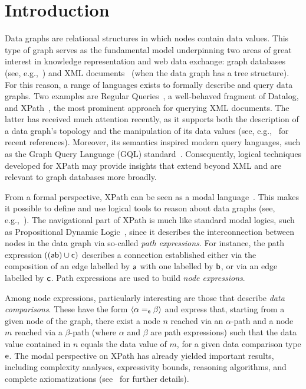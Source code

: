 \section{Introduction}
\label{sec:intro}

Data graphs are relational structures in which nodes contain data values. This type of graph serves as the fundamental model underpinning two areas of great interest in knowledge representation and web data exchange: graph databases (see, e.g.,~\cite{AnglesG08,LV12}) and XML documents~\cite{xpath:w3c} (when the data graph has a tree structure). For this reason, a range of languages exists to formally describe and query data graphs. Two examples are Regular Queries~\cite{ReutterRV17}, a well-behaved fragment of Datalog, and XPath~\cite{xpath:w3c,BojanczykMSS09}, the most prominent approach for querying XML documents. The latter has received much attention recently, as it supports both the description of a data graph's topology and the manipulation of its data values (see, e.g.,~\cite{ArecesCF25,ACDF25} for recent references). Moreover, its semantics inspired modern query languages, such as the Graph Query Language (GQL) standard~\cite{FrancisGGLMMMPR23,FrancisGGLMMMPR23b}. Consequently, logical techniques developed for XPath may provide insights that extend beyond XML and are relevant to graph databases more broadly.


From a formal perspective,  XPath can be seen as a modal language~\cite{blackburn2001modal,blackburn06}. This makes it possible to define and use logical tools to reason about data graphs (see, e.g.,~\cite{ICDT14Jair,AbriolaDFF17,Areces2017a,Figueira18,AbriolaBFF18,ArecesF21,ArecesCF25}). The navigational part of XPath is much like standard modal logics, such as Propositional Dynamic Logic~\cite{HKT00}, since it describes the interconnection between nodes in the data graph via so-called \emph{path expressions}. For instance, the path expression $((\mathsf{a}\mathsf{b}) \cup \mathsf{c})$ describes a connection established either via the composition of an edge labelled by $\mathsf{a}$ with one labelled by $\mathsf{b}$, or via an edge labelled by $\mathsf{c}$. Path expressions are used to build \emph{node expressions}.

Among node expressions, particularly interesting are those that describe \emph{data comparisons}. These have the form $\langle{\alpha =_{\mathsf{e}}\beta}\rangle$ and express that, starting from a given node of the graph, there exist a node $n$ reached via an $\alpha$-path and a node $m$ reached via a $\beta$-path (where $\alpha$ and $\beta$ are path expressions) such that the data value contained in $n$ equals the data value of $m$, for a given data comparison type $\mathsf{e}$. The modal perspective on XPath has already yielded important results, including complexity analyses, expressivity bounds, reasoning algorithms, and complete axiomatizations (see~\cite{ICDT14Jair,AbriolaDFF17,Areces2017a,Figueira18,AbriolaBFF18,ArecesF21} for further details).

